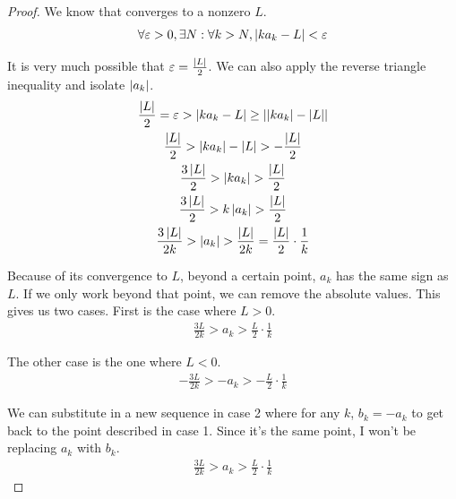 \documentclass[12pt]{report}
\begin{document}
        \begin{proof}
            We know that  converges to a nonzero $L$.
            \begin{equation}
                \forall\varepsilon > 0, \exists N : \forall k > N, \left| ka_k - L \right| < \varepsilon
            \end{equation}
    
            It is very much possible that $\varepsilon = \frac{\left| L \right|}{2}$.
            We can also apply the reverse triangle inequality and isolate $\left| a_k \right|$.
            \begin{gather}
                \frac{\left| L \right|}{2} = \varepsilon > \left| ka_k - L \right| \geq \left| \left| ka_k \right| - \left| L \right| \right|\\
                \frac{\left| L \right|}{2} > \left| ka_k \right| - \left| L \right| > -\frac{\left| L \right|}{2}\\
                \frac{3\left| L \right|}{2} > \left| ka_k \right| > \frac{\left| L \right|}{2}\\
                \frac{3\left| L \right|}{2} > k\left| a_k \right| > \frac{\left| L \right|}{2}\\
                \frac{3\left| L \right|}{2k} > \left| a_k \right| > \frac{\left| L \right|}{2k} = \frac{\left| L \right|}{2} \cdot \frac{1}{k}
            \end{gather}
    
            Because of its convergence to $L$, beyond a certain point, $a_k$ has the same sign as $L$.
            If we only work beyond that point, we can remove the absolute values.
            This gives us two cases.
            First is the case where $L > 0$.
            \begin{gather}
                \frac{3L}{2k} > a_k > \frac{L}{2} \cdot \frac{1}{k}
            \end{gather}
    
            The other case is the one where $L < 0$.
            \begin{gather}
                -\frac{3L}{2k} > -a_k > -\frac{L}{2} \cdot \frac{1}{k}
            \end{gather}
    
            We can substitute in a new sequence  in case 2 where for any $k$, $b_k = -a_k$ to get back to the point described in case 1.
            Since it's the same point, I won't be replacing $a_k$ with $b_k$.
            \begin{gather}
                \frac{3L}{2k} > a_k > \frac{L}{2} \cdot \frac{1}{k}
            \end{gather}
    

\end{proof}
\end{document}

